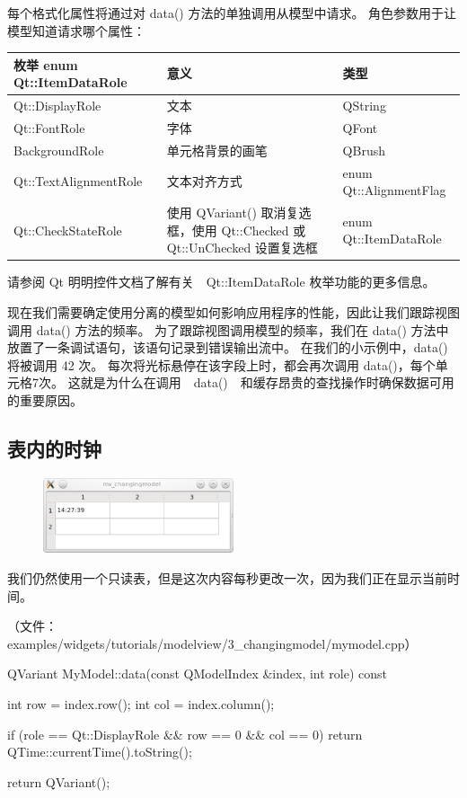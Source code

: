 每个格式化属性将通过对 data() 方法的单独调用从模型中请求。
角色参数用于让模型知道请求哪个属性：

\begin{tabular}{|l|m{15em}|l|}
	\hline
	枚举 enum Qt::ItemDataRole & 意义 &类型 \\
	\hline
	Qt::DisplayRole	 & 文本	 &QString \\
	\hline
	Qt::FontRole	& 字体	&QFont\\ 
	\hline
	BackgroundRole &	单元格背景的画笔	& QBrush\\ 
	\hline
	Qt::TextAlignmentRole	& 文本对齐方式 &enum Qt::AlignmentFlag \\
	\hline 
	Qt::CheckStateRole &	使用 QVariant() 取消复选框，使用 Qt::Checked 或 Qt::UnChecked 设置复选框 &	enum Qt::ItemDataRole \\
	\hline
\end{tabular}

请参阅 Qt 明明控件文档了解有关　Qt::ItemDataRole 枚举功能的更多信息。

现在我们需要确定使用分离的模型如何影响应用程序的性能，因此让我们跟踪视图调用 data() 方法的频率。
为了跟踪视图调用模型的频率，我们在 data() 方法中放置了一条调试语句，该语句记录到错误输出流中。
在我们的小示例中，data() 将被调用 42 次。
每次将光标悬停在该字段上时，都会再次调用 data()，每个单元格7次。
这就是为什么在调用　data()　和缓存昂贵的查找操作时确保数据可用的重要原因。

\subsection{表内的时钟}

\begin{figure}[hbt!]  
\includegraphics[width=0.5\textwidth]{img/clock}
\end{figure}

我们仍然使用一个只读表，但是这次内容每秒更改一次，因为我们正在显示当前时间。

（文件：examples/widgets/tutorials/modelview/3\_changingmodel/mymodel.cpp）

\begin{cppcode}
QVariant MyModel::data(const QModelIndex &index, int role) const
{
    int row = index.row();
    int col = index.column();

    if (role == Qt::DisplayRole && row == 0 && col == 0)
        return QTime::currentTime().toString();

    return QVariant();
}
\end{cppcode}

